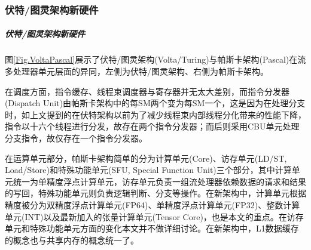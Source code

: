 \subsubsection{伏特/图灵架构新硬件}     
\subparagraph{伏特/图灵架构新硬件}
\par 图\ref{Fig.VoltaPascal}展示了伏特/图灵架构(Volta/Turing)与帕斯卡架构(Pascal)在流多处理器单元层面的异同，左侧为伏特/图灵架构、右侧为帕斯卡架构。
\par 在调度方面，指令缓存、线程束调度器与寄存器并无太大差别，而指令分发器(Dispatch Unit)由帕斯卡架构中的每SM两个变为每SM一个，这是因为在处理分支时，如上文提到的在伏特架构以前为了减少线程束内部线程分化带来的性能下降，指令以十六个线程进行分发，故存在两个指令分发器；而后则采用CBU单元处理分支指令，故仅存在一个指令分发器。
\par 在运算单元部分，帕斯卡架构简单的分为计算单元(Core)、访存单元(LD/ST, Load/Store)和特殊功能单元(SFU, Special Function Unit)三个部分，其中计算单元统一为单精度浮点计算单元，访存单元负责一组流处理器依赖数据的请求和结果的写回，特殊功能单元则负责逻辑判断、分支等操作。在新架构中，计算单元根据精度被分为双精度浮点计算单元(FP64)、单精度浮点计算单元(FP32)、整数计算单元(INT)以及最新加入的张量计算单元(Tensor Core)，也是本文的重点。在访存单元和特殊功能单元方面的变化本文并不做详细讨论。在新架构中，L1数据缓存的概念也与共享内存的概念统一了。
